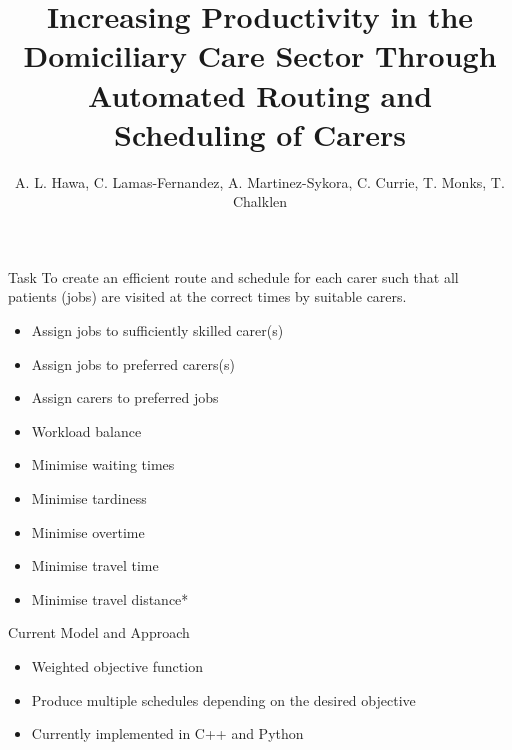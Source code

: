 \documentclass[usenames,dvipsnames]{beamer}
\begin{document}
\title{Increasing Productivity in the Domiciliary Care Sector Through Automated Routing and Scheduling of Carers}
\date{}
\author{A. L. Hawa, C. Lamas-Fernandez, A. Martinez-Sykora, C. Currie, T. Monks, T. Chalklen}
\maketitle


\begin{frame}{Task}
To create an efficient route and schedule for each carer such that all patients (jobs) are visited at the correct times by suitable carers.
\small
\begin{multicols}{2}
	\begin{itemize}
		\item Assign jobs to sufficiently skilled carer(s)
		\item Assign jobs to preferred carers(s)
		\item Assign carers to preferred jobs
		\item Workload balance %
		\item Minimise waiting times %
		\item Minimise tardiness %
		\item Minimise overtime %
		\item Minimise travel time %
		\item Minimise travel distance*
	\end{itemize}	
\end{multicols}	
\end{frame}	

\begin{frame}{Current Model and Approach}
	\begin{itemize}
		\item Weighted objective function 
		\item Produce multiple schedules depending on the desired objective
		\item Currently implemented in C++ and Python
	\end{itemize}	
\end{frame}
\end{document}
